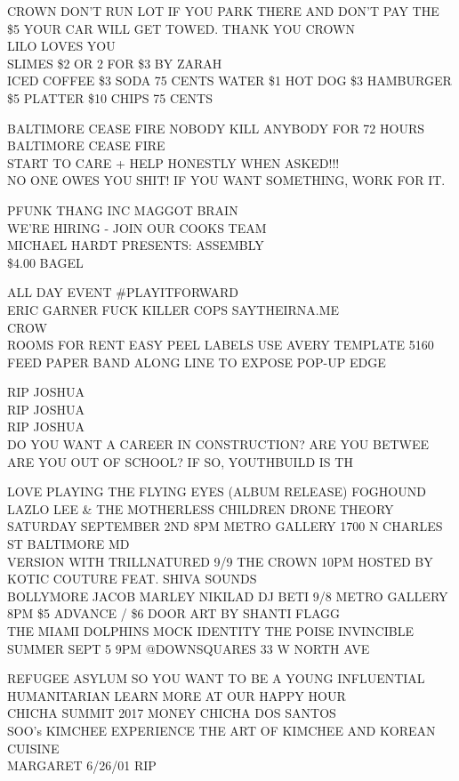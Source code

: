 \documentclass[10pt,letterpaper]{article}
\begin{document}
CROWN DON'T RUN LOT IF YOU PARK THERE AND DON'T PAY THE \$5 YOUR CAR WILL GET TOWED.  THANK YOU CROWN\\
LILO LOVES YOU\\
SLIMES \$2 OR 2 FOR \$3 BY ZARAH\\
ICED COFFEE \$3 SODA 75 CENTS WATER \$1 HOT DOG \$3 HAMBURGER \$5 PLATTER \$10 CHIPS 75 CENTS

BALTIMORE CEASE FIRE NOBODY KILL ANYBODY FOR 72 HOURS\\
BALTIMORE CEASE FIRE\\
START TO CARE + HELP HONESTLY WHEN ASKED!!!\\
NO ONE OWES YOU SHIT!  IF YOU WANT SOMETHING, WORK FOR IT.

PFUNK THANG INC MAGGOT BRAIN\\
WE'RE HIRING {-} JOIN OUR COOKS TEAM\\
MICHAEL HARDT PRESENTS: ASSEMBLY\\
\$4.00 BAGEL

ALL DAY EVENT \#PLAYITFORWARD\\
ERIC GARNER FUCK KILLER COPS SAYTHEIRNA.ME\\
CROW\\
ROOMS FOR RENT EASY PEEL LABELS USE AVERY TEMPLATE 5160 FEED PAPER BAND ALONG LINE TO EXPOSE POP{-}UP EDGE

RIP JOSHUA\\
RIP JOSHUA\\
RIP JOSHUA\\
DO YOU WANT A CAREER IN CONSTRUCTION?  ARE YOU BETWEE  ARE YOU OUT OF SCHOOL?  IF SO, YOUTHBUILD IS TH

LOVE PLAYING THE FLYING EYES (ALBUM RELEASE) FOGHOUND LAZLO LEE \& THE MOTHERLESS CHILDREN DRONE THEORY SATURDAY SEPTEMBER 2ND 8PM METRO GALLERY 1700 N CHARLES ST BALTIMORE MD\\
VERSION WITH TRILLNATURED 9/9 THE CROWN 10PM HOSTED BY KOTIC COUTURE FEAT. SHIVA SOUNDS\\
BOLLYMORE JACOB MARLEY NIKILAD DJ BETI 9/8 METRO GALLERY 8PM \$5 ADVANCE / \$6 DOOR ART BY SHANTI FLAGG\\
THE MIAMI DOLPHINS MOCK IDENTITY THE POISE INVINCIBLE SUMMER SEPT 5 9PM @DOWNSQUARES 33 W NORTH AVE

REFUGEE ASYLUM SO YOU WANT TO BE A YOUNG INFLUENTIAL HUMANITARIAN LEARN MORE AT OUR HAPPY HOUR\\
CHICHA SUMMIT 2017 MONEY CHICHA DOS SANTOS\\
SOO's KIMCHEE EXPERIENCE THE ART OF KIMCHEE AND KOREAN CUISINE\\
MARGARET 6/26/01 RIP
\end{document}
